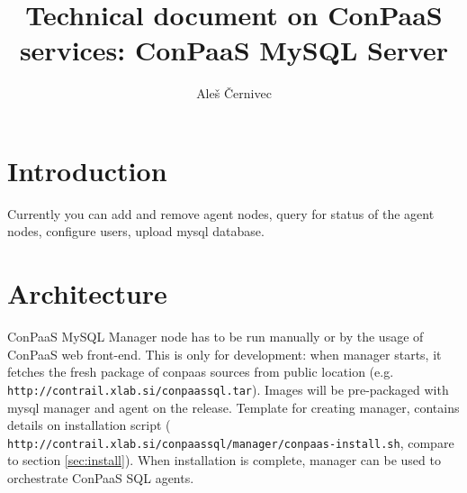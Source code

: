 \documentclass[a4paper,10pt]{article}
\begin{document}
\title{Technical document on ConPaaS services: ConPaaS MySQL Server}
\vspace{15pt}
\author{Ale{\v s} {\v C}ernivec}
\vspace{50pt}
\maketitle
\vspace{15pt}
\setlength{\parindent}{15pt}
\newpage
\tableofcontents
\newpage
\newcommand{\Cmd}[1]{\noindent {\tt #1 }\newline\vspace{2pt}\\}
\newcommand{\Des}[1]{\vspace{4pt}\noindent {\bf Description: }\\{#1}\vspace{2pt}\\ }
\newcommand{\Par}[1]{\vspace{4pt}\noindent {\bf Parameters: } \\{#1}\vspace{2pt}\\}
\newcommand{\Ret}[1]{\vspace{4pt}\noindent {\bf Returns: }\\{#1}\vspace{2pt}\\}
\newcommand{\Rai}[1]{\vspace{4pt}\noindent {\bf Raises: }\\{#1}\vspace{2pt}\\}
\newcommand{\conapi}[5]{\Cmd{#1} \Des{#2} \Par{#3} \Ret{#4} \Rai{#5}\\}

\section{Introduction}

Currently you can add and remove agent nodes, query for status of the agent nodes, configure users, upload mysql database. 

\section{Architecture}

ConPaaS MySQL Manager node has to be run manually or by the usage of ConPaaS web front-end. This is only for development: when manager starts, it fetches the fresh package of conpaas sources from public location (e.g. \\{\tt http://contrail.xlab.si/conpaassql.tar}). Images will be pre-packaged with mysql manager and agent on the release. Template for creating manager, contains details on installation script (\\{\tt http://contrail.xlab.si/conpaassql/manager/conpaas-install.sh}, compare to section \ref{sec:install}). When installation is complete, manager can be used to orchestrate ConPaaS SQL agents.
\end{document}
